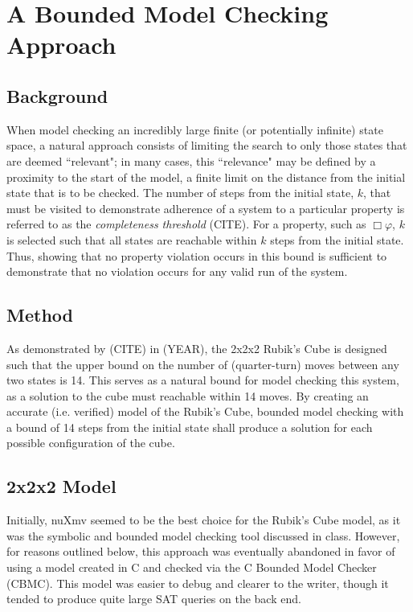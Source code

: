 \documentclass{article}
\renewcommand{\phi}{\varphi}
\newcommand{\always}{\Box}
\begin{document}
\newpage

\section{A Bounded Model Checking Approach}

\subsection{Background}
When model checking an incredibly large finite (or potentially infinite) state space, a natural approach consists of limiting the search to only those states that are deemed ``relevant"; in many cases, this ``relevance" may be defined by a proximity to the start of the model, a finite limit on the distance from the initial state that is to be checked. The number of steps from the initial state, $k$, that must be visited to demonstrate adherence of a system to a particular property is referred to as the \textit{completeness threshold} (CITE). For a property, such as $\always \phi$, $k$ is selected such that all states are reachable within $k$ steps from the initial state. Thus, showing that no property violation occurs in this bound is sufficient to demonstrate that no violation occurs for any valid run of the system.

\subsection {Method}
As demonstrated by (CITE) in (YEAR), the 2x2x2 Rubik's Cube is designed such that the upper bound on the number of (quarter-turn) moves between any two states is 14. This serves as a natural bound for model checking this system, as a solution to the cube must reachable within 14 moves. By creating an accurate (i.e. verified) model of the Rubik's Cube, bounded model checking with a bound of 14 steps from the initial state shall produce a solution for each possible configuration of the cube.

\subsection {2x2x2 Model}
Initially, nuXmv seemed to be the best choice for the Rubik's Cube model, as it was the symbolic and bounded model checking tool discussed in class. However, for reasons outlined below, this approach was eventually abandoned in favor of using a model created in C and checked via the C Bounded Model Checker (CBMC). This model was easier to debug and clearer to the writer, though it tended to produce quite large SAT queries on the back end.
\end{document}
